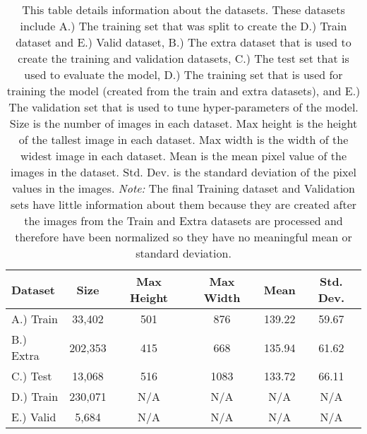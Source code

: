 \documentclass[12pt,twocolumn,letterpaper]{article}
\begin{document}
\begin{table*}
\begin{center}
\begin{tabular}{|l|c|c|c|c|c|}
\hline
Dataset & Size & Max Height & Max Width & Mean & Std. Dev. \\
\hline
A.) Train & 33,402 & 501 & 876 & 139.22 & 59.67 \\
\hline
B.) Extra & 202,353 & 415 & 668 & 135.94 & 61.62 \\
\hline
C.) Test & 13,068 & 516 & 1083 & 133.72 & 66.11 \\
\hline
D.) Train & 230,071 & N/A & N/A & N/A & N/A \\
\hline
E.) Valid & 5,684 & N/A & N/A & N/A & N/A \\
\hline
\end{tabular}
\end{center}
\caption{This table details information about the datasets. These datasets include
A.) The training set that was split to create the D.) Train dataset and E.) Valid dataset, 
B.) The extra dataset that is used to create the training and validation datasets, 
C.) The test set that is used to evaluate the model, 
D.) The training set that is used for training the model (created from the train and extra datasets), 
and E.) The validation set that is used to tune hyper-parameters of the model. 
Size is the number of images in each dataset. Max 
height is the height of the tallest image in each dataset. Max width is the 
width of the widest image in each dataset. Mean is the mean pixel value of the
images in the dataset. Std. Dev. is the standard deviation of the pixel values 
in the images. \textit{Note:} The final Training dataset and Validation sets have 
little information about them because they are created after the images from the
Train and Extra datasets are processed and therefore have been normalized so they 
have no meaningful mean or standard deviation.}
\label{table:stats}
\end{table*}

\begin{table}
\begin{center}
\end{center}
\caption{This table shows the frequency of various lengths of digits that are 
found in the Training dataset.}
\label{table:lengths}
\end{table}
\end{document}
